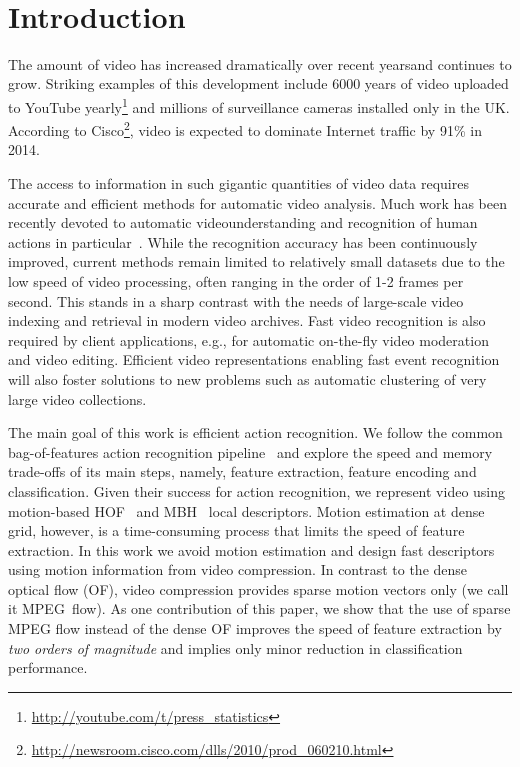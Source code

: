 \documentclass[10pt,twocolumn,letterpaper]{article}
\begin{document}

\mbox{}\vspace{-1.3cm}\\
\section{Introduction}

The amount of video has increased dramatically over recent yearsand continues to grow. Striking examples of this development
include 6000 years of video uploaded to YouTube
yearly\footnote{\scriptsize
\url{http://youtube.com/t/press\_statistics}} and millions of
surveillance cameras installed only in the UK. According to
Cisco\footnote{\scriptsize
\url{http://newsroom.cisco.com/dlls/2010/prod_060210.html}},
video is expected to dominate Internet traffic by 91\% in 2014.

The access to information in such gigantic quantities of video
data requires accurate and efficient methods for automatic video analysis. Much work has been recently devoted to automatic videounderstanding and recognition of human actions in
particular~\cite{Laptev08,Liu11,Niebles10,Sadanand12,Schuldt04,Wang12}.
While the recognition accuracy has been continuously improved,
current methods remain limited to relatively small datasets due
to the low speed of video processing, often ranging in the order of 1-2 frames per second. This stands in a sharp contrast with
the needs of large-scale video indexing and retrieval in modern
video archives. Fast video recognition is also required by
client applications, e.g., for automatic on-the-fly video
moderation and video editing. Efficient video representations
enabling fast event recognition will also foster solutions to
new problems such as automatic clustering of very large video
collections.

The main goal of this work is efficient action recognition. We
follow the common bag-of-features action recognition
pipeline~\cite{Laptev08,Schuldt04,Wang12} and explore the speed
and memory trade-offs of its main steps, namely, feature
extraction, feature encoding and classification. Given their
success for action recognition, we represent video
using motion-based HOF~\cite{Laptev08} and MBH~\cite{Wang12}
local descriptors. Motion estimation at dense grid, however, is
a time-consuming process that
limits the speed of feature extraction.
In this work we avoid motion estimation and design
fast
descriptors using motion information from video compression.
In contrast to the dense optical flow (OF), video compression
provides sparse motion vectors only (we call it MPEG~flow).
As one contribution of this paper, we show that the use of
sparse MPEG flow instead of the dense OF improves the speed of
feature extraction by {\em two orders of magnitude} and implies
only minor reduction in classification performance.
\end{document}
